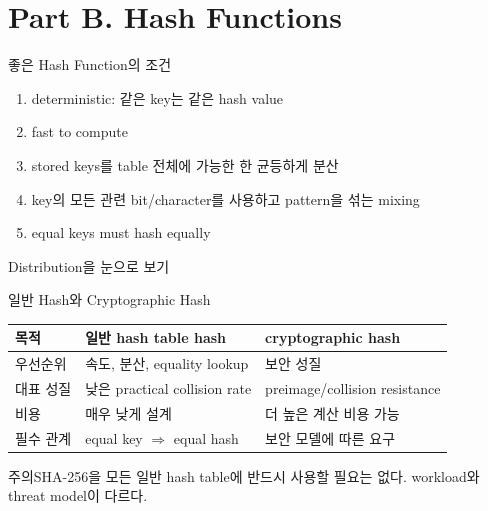 \section{Part B. Hash Functions}
\begin{frame}{좋은 Hash Function의 조건}
\begin{enumerate}
\item deterministic: 같은 key는 같은 hash value
\item fast to compute
\item stored keys를 table 전체에 가능한 한 균등하게 분산
\item key의 모든 관련 bit/character를 사용하고 pattern을 섞는 mixing
\item equal keys must hash equally
\end{enumerate}
\end{frame}
\begin{frame}{Distribution을 눈으로 보기}
\centering{}
\end{frame}
\begin{frame}{일반 Hash와 Cryptographic Hash}
\centering\begin{tabular}{lll}\toprule
목적&일반 hash table hash&cryptographic hash\\\midrule
우선순위&속도, 분산, equality lookup&보안 성질\\
대표 성질&낮은 practical collision rate&preimage/collision resistance\\
비용&매우 낮게 설계&더 높은 계산 비용 가능\\
필수 관계&equal key $\Rightarrow$ equal hash&보안 모델에 따른 요구\\\bottomrule
\end{tabular}
\begin{alertblock}{주의}SHA-256을 모든 일반 hash table에 반드시 사용할 필요는 없다. workload와 threat model이 다르다.\end{alertblock}
\end{frame}
